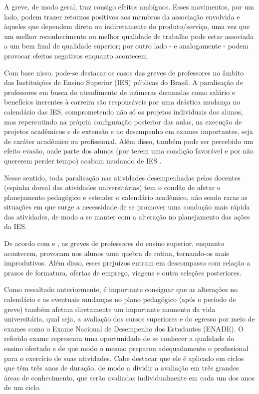 A greve, de modo geral, traz consigo efeitos ambíguos. Esses movimentos, por um lado, podem trazer retornos positivos aos membros da associação envolvida e àqueles que dependem direta ou indiretamente do produto/serviço, uma vez que um melhor reconhecimento ou melhor qualidade de trabalho pode estar associada a um bem final de qualidade superior; por outro lado - e analogamente - podem provocar efeitos negativos enquanto acontecem.

Com base nisso, pode-se destacar os casos das greves de professores no âmbito das Instituições de Ensino Superior (IES) públicas do Brasil. A paralisação de professores em busca do atendimento de inúmeras demandas como salário e benefícios inerentes à carreira são responsáveis por uma drástica mudança no calendário das IES, comprometendo não só os projetos individuais dos alunos, mas repercutindo na própria configuração posterior das aulas, na execução de projetos acadêmicos e de extensão e no desempenho em exames importantes, seja de caráter acadêmico ou profissional. Além disso, também pode ser percebido um efeito evasão, onde parte dos alunos (por terem uma condição favorável e por não quererem perder tempo) acabam mudando de IES \cite{Belot2010}.

Nesse sentido, toda paralisação nas atividades desempenhadas pelos docentes (espinha dorsal das atividades universitárias) tem o condão de afetar o planejamento pedagógico e estender o calendário acadêmico, não sendo raras as situações em que surge a necessidade de se promover uma condução mais rápida das atividades, de modo a se manter com a alteração no planejamento das ações da IES.

De acordo com  e , as greves de professores do ensino superior, enquanto acontecem, provocam nos alunos uma quebra de rotina, tornando-os mais improdutivos. Além disso, esses prejuízos entram em descompasso com relação a prazos de formatura, ofertas de emprego, viagens e outra seleções posteriores.

Como ressaltado anteriormente, é importante consignar que as alterações no calendário e as eventuais mudanças no plano pedagógico (após o período de greve) também afetam diretamente um importante momento da vida universitária, qual seja, a avaliação dos cursos superiores e do egresso por meio de exames como o Exame Nacional de Desempenho dos Estudantes (ENADE). O referido exame representa uma oportunidade de se conhecer a qualidade do ensino ofertado e de que modo o mesmo preparou adequadamente o profissional para o exercício de suas atividades. Cabe destacar que ele é aplicado em ciclos que têm três anos de duração, de modo a dividir a avaliação em três grandes áreas de conhecimento, que serão avaliadas individualmente em cada um dos anos de um ciclo.

